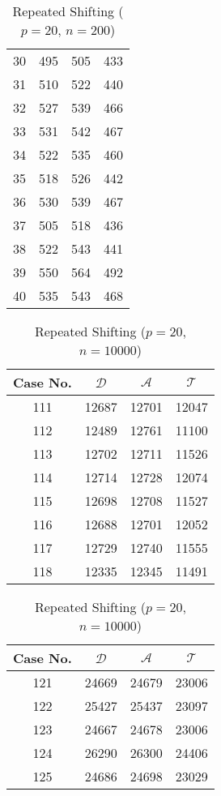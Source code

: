\begin{table}[!htb]
{\begin{tabular}{|c|c|c|c|}
30 & 495 & 505 & 433 \\
31 & 510 & 522 & 440 \\
32 & 527 & 539 & 466 \\
33 & 531 & 542 & 467 \\
34 & 522 & 535 & 460 \\
35 & 518 & 526 & 442 \\
36 & 530 & 539 & 467 \\
37 & 505 & 518 & 436 \\
38 & 522 & 543 & 441 \\
39 & 550 & 564 & 492 \\
40 & 535 & 543 & 468 \\
\hline
\end{tabular}
\caption{Repeated Shifting ($p=20$, $n=200$)}
\label{tab:dat-20}
}
\end{table}


\begin{table}[!hb]
\parbox{.45\linewidth}{
\centering
\begin{tabular}{|c|c|c|c|}
\hline
Case No. & $\mathcal{D}$ & $\mathcal{A}$ & $\mathcal{T}$ \\
\hline
111 & 12687 & 12701 & 12047 \\
112 & 12489 & 12761 & 11100 \\
113 & 12702 & 12711 & 11526 \\
114 & 12714 & 12728 & 12074 \\
115 & 12698 & 12708 & 11527 \\
116 & 12688 & 12701 & 12052 \\
117 & 12729 & 12740 & 11555 \\
118 & 12335 & 12345 & 11491 \\
\hline
\end{tabular}
\caption{Repeated Shifting ($p=20$, $n=5000$)}
\label{tab:dat-20}
}
\hfill
\parbox{.45\linewidth}{
\centering
\begin{tabular}{|c|c|c|c|}
\hline
Case No. & $\mathcal{D}$ & $\mathcal{A}$ & $\mathcal{T}$ \\
\hline
121 & 24669 & 24679 & 23006 \\
122 & 25427 & 25437 & 23097 \\
123 & 24667 & 24678 & 23006 \\
124 & 26290 & 26300 & 24406 \\
125 & 24686 & 24698 & 23029 \\
\hline
\end{tabular}
\caption{Repeated Shifting ($p=20$, $n=10000$)}
\label{tab:dat-20}
}
\end{table}

